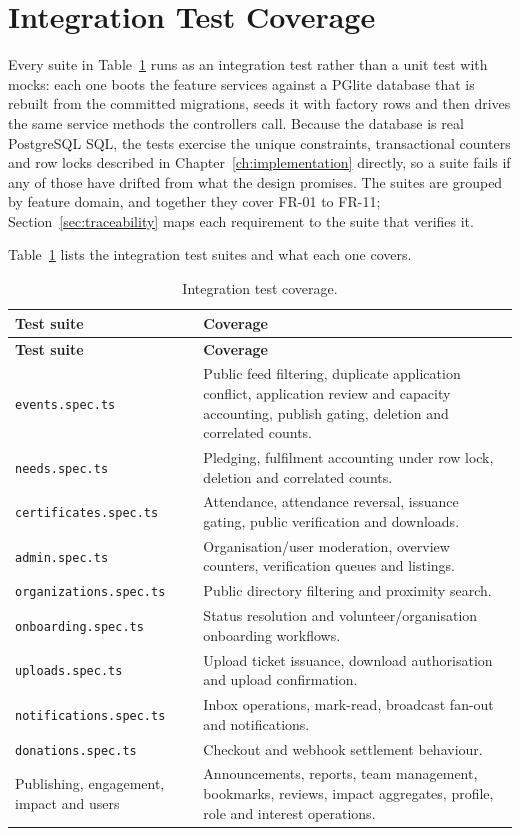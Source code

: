 \section{Integration Test Coverage}
Every suite in Table~\ref{tab:tests} runs as an integration test rather than a unit test with mocks: each one boots the feature services against a PGlite database that is rebuilt from the committed migrations, seeds it with factory rows and then drives the same service methods the controllers call. Because the database is real PostgreSQL SQL, the tests exercise the unique constraints, transactional counters and row locks described in Chapter~\ref{ch:implementation} directly, so a suite fails if any of those have drifted from what the design promises. The suites are grouped by feature domain, and together they cover FR-01 to FR-11; Section~\ref{sec:traceability} maps each requirement to the suite that verifies it.

Table~\ref{tab:tests} lists the integration test suites and what each one covers.

\begin{longtable}{|p{}|p{}|}
\caption{Integration test coverage.}\label{tab:tests}\\\hline
\textbf{Test suite} & \textbf{Coverage}\\\hline
\endfirsthead
\hline
\textbf{Test suite} & \textbf{Coverage}\\\hline
\endhead
\texttt{events.spec.ts} & Public feed filtering, duplicate application conflict, application review and capacity accounting, publish gating, deletion and correlated counts.\\\hline
\texttt{needs.spec.ts} & Pledging, fulfilment accounting under row lock, deletion and correlated counts.\\\hline
\texttt{certificates.spec.ts} & Attendance, attendance reversal, issuance gating, public verification and downloads.\\\hline
\texttt{admin.spec.ts} & Organisation/user moderation, overview counters, verification queues and listings.\\\hline
\texttt{organizations.spec.ts} & Public directory filtering and proximity search.\\\hline
\texttt{onboarding.spec.ts} & Status resolution and volunteer/organisation onboarding workflows.\\\hline
\texttt{uploads.spec.ts} & Upload ticket issuance, download authorisation and upload confirmation.\\\hline
\texttt{notifications.spec.ts} & Inbox operations, mark-read, broadcast fan-out and notifications.\\\hline
\texttt{donations.spec.ts} & Checkout and webhook settlement behaviour.\\\hline
Publishing, engagement, impact and users & Announcements, reports, team management, bookmarks, reviews, impact aggregates, profile, role and interest operations.\\\hline
\end{longtable}

